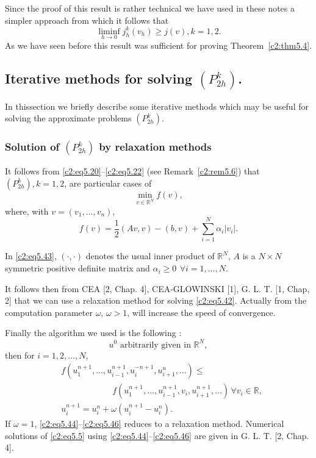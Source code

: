 Since the proof of this result is rather technical we have used in
these notes a simpler approach from which it follows that  
$$
\liminf_{h \to 0} j^k_h (v_h) \geq j(v), k=1, 2.
$$
As we have seen before this result was sufficient for proving 
Theorem~\ref{c2:thm5.4}. 

\subsection{Iterative methods for solving
  $(P^k_{2h})$.}\label{c2:ss5.6}%

In this\pageoriginale   section we briefly describe some iterative methods which may
be useful for solving the approximate problems $(P^k_{2h})$. 

\subsubsection{Solution of $(P^k_{2h})$ by relaxation
  methods}\label{c2:sss5.6.1}%
It follows from \eqref{c2:eq5.20}--\eqref{c2:eq5.22} (see
Remark~\ref{c2:rem5.6}) that $(P^k_{2h}), k=1, 2$, are particular
cases of  
\begin{equation}
\min_{v \in \mathbb{R}^N} f (v),\tag{5.42}\label{c2:eq5.42} 
\end{equation}
where, with $v = (v_1, \ldots , v_n)$, 
\begin{equation}
f (v) = \frac{1}{2} (Av, v)- (b, v) + \sum^N_{i =1} \alpha_i | v_i
|. \tag{5.43}\label{c2:eq5.43} 
\end{equation}

In \eqref{c2:eq5.43}, $(\cdot , \cdot)$ denotes the usual inner
product of $\mathbb{R}^N$, $A$ is a $N \times N$ symmetric positive
definite matrix and $\alpha_i \geq 0 ~\, \forall  i=1, \ldots, N$. 

It follows then from CEA [2, Chap. 4], CEA-GLOWINSKI [1], G. L. T. [1,
  Chap, 2] that we can use a relaxation method for solving
\eqref{c2:eq5.42}. Actually from the computation parameter $\omega$,
$\omega > 1$, will increase the speed of convergence. 

Finally the algorithm we used is the following :
\begin{equation}
u^0 \text{ arbitrarily given in } \mathbb{R}^N,\tag{5.44}\label{c2:eq5.44}
\end{equation}
then for  $i= 1, 2, \ldots, N$, 
\begin{align}
& f(u^{n+1}_1, \ldots , u^{n+1}_{i-1}, u^{- n+ 1}_{i}, u^n_{i + 1},
  \ldots ) \leq\nonumber\\
&\qquad\qquad\qquad f(u^{ n+ 1}_{1}, \ldots ,  u^{n + 1}_{i-1}, v_i ,
  u^{n+1}_{i + 1}, \ldots )\, \forall  v_i \in \mathbb{R},
  \tag{5.45}\label{c2:eq5.45}\\ 
& u^{n+1}_i = u^n_i + \omega (u^{n+1}_i -
  u^n_i). \tag{5.46}\label{c2:eq5.46}  
\end{align}
If $\omega = 1$, \eqref{c2:eq5.44}--\eqref{c2:eq5.46} reduces to a relaxation
method. Numerical solutions of  \eqref{c2:eq5.5} using
\eqref{c2:eq5.44}--\eqref{c2:eq5.46} are 
given in G. L. T. [2, Chap. 4].  

